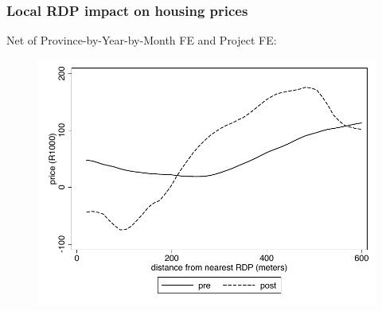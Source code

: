 \documentclass[aspectratio=149]{beamer}
\begin{document}
\begin{frame}
\frametitle{Local RDP impact on housing prices}
Net of Province-by-Year-by-Month FE and Project FE:
\begin{center}
\begin{figure}
\includegraphics[scale=0.7]{reg_plot2.pdf}
\end{figure}
\end{center}
\end{frame}

\end{document}
